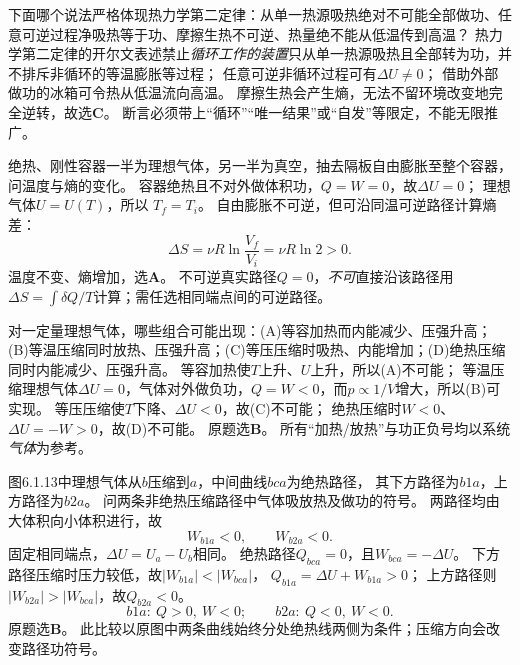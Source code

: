 \problemtext 下面哪个说法严格体现热力学第二定律：从单一热源吸热绝对不可能全部做功、任意可逆过程净吸热等于功、摩擦生热不可逆、热量绝不能从低温传到高温？
\workings
热力学第二定律的开尔文表述禁止\emph{循环工作的装置}只从单一热源吸热且全部转为功，并不排斥非循环的等温膨胀等过程；
任意可逆非循环过程可有$\Delta U\ne0$；
借助外部做功的冰箱可令热从低温流向高温。
摩擦生热会产生熵，无法不留环境改变地完全逆转，故选\textbf{C}。
\crosscheck 断言必须带上“循环”“唯一结果”或“自发”等限定，不能无限推广。

\problemtext 绝热、刚性容器一半为理想气体，另一半为真空，抽去隔板自由膨胀至整个容器，问温度与熵的变化。
\workings
容器绝热且不对外做体积功，$Q=W=0$，故$\Delta U=0$；
理想气体$U=U(T)$，所以
$\boxed{T_f=T_i}$。
自由膨胀不可逆，但可沿同温可逆路径计算熵差：
\[
\boxed{\Delta S=\nu R\ln\frac{V_f}{V_i}
=\nu R\ln2>0}.
\]
温度不变、熵增加，选\textbf{A}。
\crosscheck 不可逆真实路径$Q=0$，\emph{不可}直接沿该路径用$\Delta S=\int\delta Q/T$计算；需任选相同端点间的可逆路径。

\problemtext 对一定量理想气体，哪些组合可能出现：(A)等容加热而内能减少、压强升高；(B)等温压缩同时放热、压强升高；(C)等压压缩时吸热、内能增加；(D)绝热压缩同时内能减少、压强升高。
\workings
等容加热使$T$上升、$U$上升，所以(A)不可能；
等温压缩理想气体$\Delta U=0$，气体对外做负功，$Q=W<0$，而$p\propto1/V$增大，所以(B)可实现。
等压压缩使$T$下降、$\Delta U<0$，故(C)不可能；
绝热压缩时$W<0$、$\Delta U=-W>0$，故(D)不可能。
原题选\textbf{B}。
\crosscheck 所有“加热/放热”与功正负号均以系统\emph{气体}为参考。

\problemtext 图6.1.13中理想气体从$b$压缩到$a$，中间曲线$bca$为绝热路径，
其下方路径为$b1a$，上方路径为$b2a$。
问两条非绝热压缩路径中气体吸放热及做功的符号。
\workings
两路径均由大体积向小体积进行，故
\[
W_{b1a}<0,\qquad W_{b2a}<0.
\]
固定相同端点，$\Delta U=U_a-U_b$相同。
绝热路径$Q_{bca}=0$，且$W_{bca}=-\Delta U$。
下方路径压缩时压力较低，故$|W_{b1a}|<|W_{bca}|$，
$Q_{b1a}=\Delta U+W_{b1a}>0$；
上方路径则$|W_{b2a}|>|W_{bca}|$，故$Q_{b2a}<0$。
\[
\boxed{b1a:\ Q>0,\ W<0;\qquad b2a:\ Q<0,\ W<0}.
\]
原题选\textbf{B}。
\crosscheck 此比较以原图中两条曲线始终分处绝热线两侧为条件；压缩方向会改变路径功符号。
